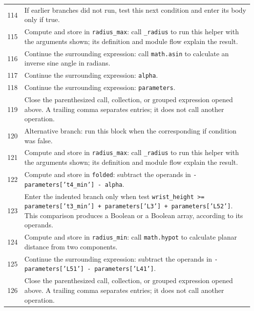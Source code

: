 \documentclass[11pt,a4paper]{book}
\begin{document}
\begin{longtable}{r p{}}
114 & If earlier branches did not run, test this next condition and enter its body only if true. \\

115 & Compute and store in \texttt{radius\_max}: call \texttt{\_radius} to run this helper with the arguments shown; its definition and module flow explain the result.  \\

116 & Continue the surrounding expression: call \texttt{math.asin} to calculate an inverse sine angle in radians. \\

117 & Continue the surrounding expression: \texttt{alpha}. \\

118 & Continue the surrounding expression: \texttt{parameters}. \\

119 & Close the parenthesized call, collection, or grouped expression opened above. A trailing comma separates entries; it does not call another operation. \\

120 & Alternative branch: run this block when the corresponding if condition was false. \\

121 & Compute and store in \texttt{radius\_max}: call \texttt{\_radius} to run this helper with the arguments shown; its definition and module flow explain the result.  \\

122 & Compute and store in \texttt{folded}: subtract the operands in \texttt{-parameters['t4\_min'] - alpha}.  \\

123 & Enter the indented branch only when test \texttt{wrist\_height >= parameters['t3\_min'] + parameters['L3'] + parameters['L52']}. This comparison produces a Boolean or a Boolean array, according to its operands. \\

124 & Compute and store in \texttt{radius\_min}: call \texttt{math.hypot} to calculate planar distance from two components.  \\

125 & Continue the surrounding expression: subtract the operands in \texttt{-parameters['L51'] - parameters['L41']}. \\

126 & Close the parenthesized call, collection, or grouped expression opened above. A trailing comma separates entries; it does not call another operation. \\


\end{longtable}
\end{document}
